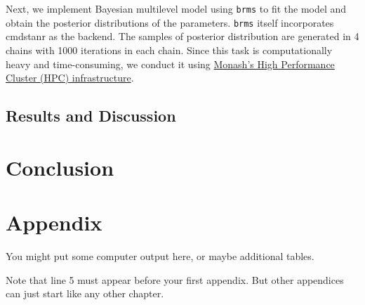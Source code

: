 \documentclass{monashthesis}
\begin{document}
Next, we implement Bayesian multilevel model using \texttt{brms} \autocite{brms} to fit the model and obtain the posterior distributions of the parameters. \texttt{brms} itself incorporates cmdstanr \autocite{cmdstanr} as the backend. The samples of posterior distribution are generated in 4 chains with 1000 iterations in each chain. Since this task is computationally heavy and time-consuming, we conduct it using \href{https://docs.monarch.erc.monash.edu/MonARCH/aboutMonArch.html}{Monash's High Performance Cluster (HPC) infrastructure}.

\hypertarget{results-and-discussion}{%
\section{Results and Discussion}\label{results-and-discussion}}

\hypertarget{ch:conclusion}{%
\chapter{Conclusion}\label{ch:conclusion}}

\appendix

\hypertarget{appendix}{%
\chapter{Appendix}\label{appendix}}

You might put some computer output here, or maybe additional tables.

Note that line 5 must appear before your first appendix. But other appendices can just start like any other chapter.

\printbibliography[heading=bibintoc]
\end{document}
